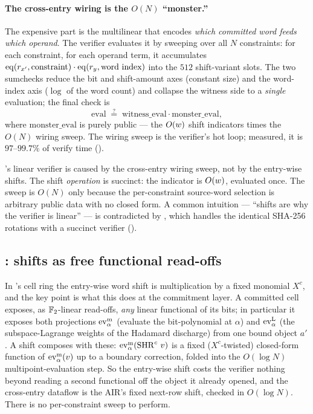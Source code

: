\paragraph{The cross-entry wiring is the $O(N)$ ``monster.''}
The expensive part is the multilinear that encodes \emph{which committed
word feeds which operand}. The verifier evaluates it by sweeping over all
$N$ constraints: for each constraint, for each operand term, it
accumulates $\operatorname{eq}(r_{x'},\text{constraint})\cdot\operatorname{eq}(r_y,\text{word index})$
into the $512$ shift-variant slots. The two sumchecks reduce the bit and
shift-amount axes (constant size) and the word-index axis ($\log$ of the
word count) and collapse the witness side to a \emph{single} evaluation;
the final check is
\[
  \mathrm{eval} \;\stackrel{?}{=}\; \mathrm{witness\_eval}\cdot\mathrm{monster\_eval},
\]
where $\mathrm{monster\_eval}$ is purely public --- the $O(w)$ shift
indicators times the $O(N)$ wiring sweep. The wiring sweep is the
verifier's hot loop; measured, it is $97$--$99.7\%$ of verify time
().

\begin{observation}
\label{obs:wiring-not-shifts}
\binius{}'s linear verifier is caused by the cross-entry wiring sweep, not
by the entry-wise shifts. The shift \emph{operation} is succinct: the
indicator is $O(w)$, evaluated once. The sweep is $O(N)$ only because
the per-constraint source-word selection is arbitrary public data with no
closed form. A common intuition --- ``shifts are why the verifier is
linear'' --- is contradicted by \zinc{}, which handles the identical
SHA-256 rotations with a succinct verifier ().
\end{observation}

\subsection{\zinc{}: shifts as free functional read-offs}
\label{sec:shifts-zinc}

In \zinc{}'s cell ring the entry-wise word shift is multiplication by a
fixed monomial $X^c$, and the key point is what this does at the
commitment layer. A committed cell exposes, as $\mathbb{F}_2$-linear read-offs,
\emph{any} linear functional of its bits; in particular it exposes both
projections $\operatorname{ev}^{\mathrm{m}}_{\alpha}$ (evaluate the bit-polynomial at $\alpha$) and $\operatorname{ev}^{\mathrm{L}}_{\alpha}$
(the subspace-Lagrange weights of the Hadamard discharge) from one bound
object $a'$. A shift composes with these: $\operatorname{ev}^{\mathrm{m}}_{\alpha}(\operatorname{SHR}^c\, v)$ is a fixed
($X^c$-twisted) closed-form function of $\operatorname{ev}^{\mathrm{m}}_{\alpha}(v)$ up to a boundary
correction, folded into the $O(\log N)$ multipoint-evaluation step. So
the entry-wise shift costs the verifier nothing beyond reading a second
functional off the object it already opened, and the cross-entry dataflow
is the AIR's fixed next-row shift, checked in $O(\log N)$. There is no
per-constraint sweep to perform.

